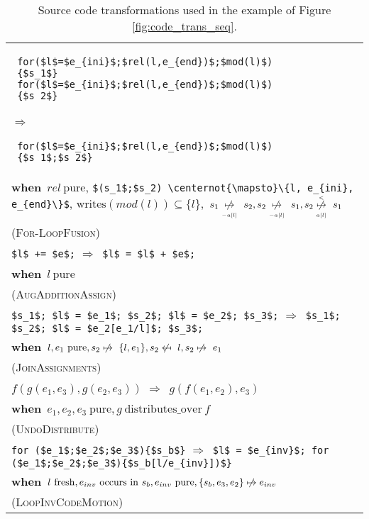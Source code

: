 \documentclass[svgnames,usenames,preprint,nocopyrightspace]{sigplanconf}
\newcommand{\rw}{\ensuremath{\Rightarrow}}
\newcommand{\when}{\ensuremath{\mathbf{when}}}
\newcommand{\nowrites}{\centernot{\mapsto}}
\newcommand{\noreads}{\centernot{\mapsfrom}}
\newcommand{\pure}{\mathrm{pure}}
\newcommand{\fresh}{\mathrm{fresh}}
\newcommand{\writes}{\mathrm{writes}}
\newcommand{\occurs}{\mathrm{occurs~in}}
\newcommand{\distributesover}{\mathrm{distributes\_over}}
\newcommand{\nowritesexcarrays}{\underset{_{-a[l]}}{\nowrites}}
\newcommand{\nowritesarray}{\underset{_{a[l]}}{\overset{_<}{\nowrites}}}
\begin{document}
\begin{table*}[t]
   \begin{center}
     \begin{tabular}{l@{}}
\begin{minipage}{4,8cm}
       \begin{lstlisting}
 for($l$=$e_{ini}$;$rel(l,e_{end})$;$mod(l)$)
 {$s_1$}
 for($l$=$e_{ini}$;$rel(l,e_{end})$;$mod(l)$)
 {$s_2$}
 \end{lstlisting}
      \end{minipage}
       \rw~~
       \begin{minipage}{5.2cm}
       \begin{lstlisting}
 for($l$=$e_{ini}$;$rel(l,e_{end})$;$mod(l)$) 
 {$s_1$;$s_2$}
       \end{lstlisting}
       \end{minipage}\vspace{-2ex}\\
\when\ $rel~\pure$,
       \lstinline|$(s_1$;$s_2) \nowrites \{l, e_{ini}, e_{end}\}$|, $\writes(mod(l)) \subseteq \{l\},$$~ s_1 \nowritesexcarrays ~ s_2, s_2 \nowritesexcarrays ~ s_1, s_2 \nowritesarray ~ s_1$\\
\hfill \textsc{(For-LoopFusion)}\\
\lstinline|$l$ += $e$;|
        \rw\ 
       \lstinline|$l$ = $l$ + $e$;| \\ 
       \when\ $l~\pure$\\
       \hfill \textsc{(AugAdditionAssign)}\\
\lstinline|$s_1$; $l$ = $e_1$; $s_2$; $l$ = $e_2$; $s_3$;| \rw\ 
       \lstinline|$s_1$; $s_2$; $l$ = $e_2[e_1/l]$; $s_3$;| \\ 
       \when\ $l, e_1~\pure, s_2 \nowrites\ \{l, e_1\}, s_2 \noreads\ l, s_2 \nowrites\ e_1$\\
      \hfill \textsc{(JoinAssignments)}\\
$f(g(e_1,e_3),g(e_2,e_3))$ \rw\ $g(f(e_1,e_2),e_3)$ \\ 
       \when\ $e_1, e_2, e_3~\pure, g~\distributesover\ f$\\
       \hfill \textsc{(UndoDistribute)}\\
\lstinline|for ($e_1$;$e_2$;$e_3$){$s_b$}| \rw\
       \lstinline|$l$ = $e_{inv}$; for ($e_1$;$e_2$;$e_3$){$s_b[l/e_{inv}])$}|\\
       \when\ $l~\fresh, e_{inv} ~\occurs~ s_b, e_{inv}~\pure, \{s_b, e_3, e_2 \}\nowrites e_{inv}$\\
       \hfill \textsc{(LoopInvCodeMotion)}\\
\end{tabular}
  \end{center}
   \caption{Source code transformations used in the
     example of Figure \ref{fig:code_trans_seq}.}
   \label{tab:transformations-math-1}
\end{table*}
\end{document}
